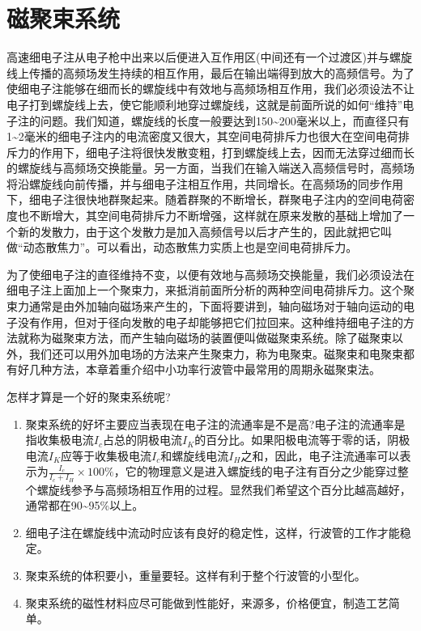 \chapter{磁聚束系统} \label{ch7}

高速细电子注从电子枪中出来以后便进入互作用区(中间还有一个过渡区)并与螺旋线上传播的高频场发生持续的相互作用，最后在输出端得到放大的高频信号。为了使细电子注能够在细而长的螺旋线中有效地与高频场相互作用，我们必须设法不让电子打到螺旋线上去，使它能顺利地穿过螺旋线，这就是前面所说的如何“维持”电子注的问题。我们知道，螺旋线的长度一般要达到150\textasciitilde 200毫米以上，而直径只有1\textasciitilde 2毫米的细电子注内的电流密度又很大，其空间电荷排斥力也很大在空间电荷排斥力的作用下，细电子注将很快发散变粗，打到螺旋线上去，因而无法穿过细而长的螺旋线与高频场交换能量。另一方面，当我们在输入端送入高频信号时，高频场将沿螺旋线向前传播，并与细电子注相互作用，共同增长。在高频场的同步作用下，细电子注很快地群聚起来。随着群聚的不断增长，群聚电子注内的空间电荷密度也不断增大，其空间电荷排斥力不断增强，这样就在原来发散的基础上增加了一个新的发散力，由于这个发散力是加入高频信号以后才产生的，因此就把它叫做“动态散焦力”。可以看出，动态散焦力实质上也是空间电荷排斥力。

为了使细电子注的直径维持不变，以便有效地与高频场交换能量，我们必须设法在细电子注上面加上一个聚束力，来抵消前面所分析的两种空间电荷排斥力。这个聚束力通常是由外加轴向磁场来产生的，下面将要讲到，轴向磁场对于轴向运动的电子没有作用，但对于径向发散的电子却能够把它们拉回来。这种维持细电子注的方法就称为磁聚束方法，而产生轴向磁场的装置便叫做磁聚束系统。除了磁聚束以外，我们还可以用外加电场的方法来产生聚束力，称为电聚束。磁聚束和电聚束都有好几种方法，本章着重介绍中小功率行波管中最常用的周期永磁聚束法。

怎样才算是一个好的聚束系统呢?

\begin{enumerate}
	\item 聚束系统的好坏主要应当表现在电子注的流通率是不是高?电子注的流通率是指收集极电流$ I_c $占总的阴极电流$ I_K $的百分比。如果阳极电流等于零的话，阴极电流$ I_K $应等于收集极电流$ I_c $和螺旋线电流$ I_H $之和，因此，电子注流通率可以表示为$ \frac{I_c}{I_c + I_H} \times 100\%$，它的物理意义是进入螺旋线的电子注有百分之少能穿过整个螺旋线参予与高频场相互作用的过程。显然我们希望这个百分比越高越好，通常都在90\textasciitilde95\%以上。
	\item 细电子注在螺旋线中流动时应该有良好的稳定性，这样，行波管的工作才能稳定。
	\item 聚束系统的体积要小，重量要轻。这样有利于整个行波管的小型化。
	\item 聚束系统的磁性材料应尽可能做到性能好，来源多，价格便宜，制造工艺简单。
\end{enumerate}

